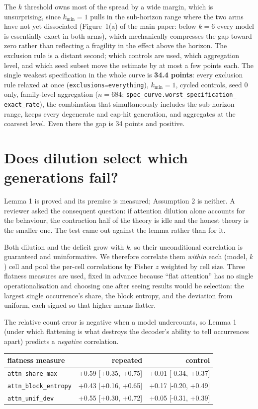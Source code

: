 \documentclass[11pt]{article}
\begin{document}
The $k$ threshold owns most of the spread by a wide margin, which is
unsurprising, since $k_{\min}=1$ pulls in the sub-horizon range where the two arms have not
yet dissociated (Figure~1(a) of the main paper: below $k=6$ every
model is essentially exact in both arms), which mechanically compresses the
gap toward zero rather than reflecting a fragility in the effect above the
horizon. The exclusion rule is a distant second; which controls are used,
which aggregation level, and which seed subset move the estimate by at most a
few points each. The single weakest specification in the whole curve is
\textbf{34.4 points}: every exclusion rule relaxed at once
(\texttt{exclusions=everything}), $k_{\min}=1$, cycled controls, seed 0 only,
family-level aggregation ($n=684$; \texttt{spec\_curve.worst\_specification\_}
\texttt{exact\_rate}), the combination that simultaneously includes the
sub-horizon range, keeps every degenerate and cap-hit generation, and
aggregates at the coarsest level. Even there the gap is 34 points and positive.

\section{Does dilution select which generations fail?}
\label{sec:s12}

Lemma 1 is proved and its premise is measured; Assumption 2 is neither. A
reviewer asked the consequent question: if attention dilution alone accounts for
the behaviour, the contraction half of the theory is idle and the honest theory
is the smaller one. The test came out against the lemma rather than for it.

Both dilution and the deficit grow with $k$, so their unconditional correlation
is guaranteed and uninformative. We therefore correlate them \emph{within} each
(model, $k$) cell and pool the per-cell correlations by Fisher $z$ weighted by
cell size. Three flatness measures are used, fixed in advance because ``flat
attention'' has no single operationalisation and choosing one after seeing
results would be selection: the largest single occurrence's share, the block
entropy, and the deviation from uniform, each signed so that higher means
flatter.

The relative count error is negative when a model undercounts, so Lemma 1
(under which flattening is what destroys the decoder's ability to tell occurrences
apart) predicts a \emph{negative} correlation.

\begin{center}
\begin{tabular}{lrr}
\toprule
flatness measure & repeated & control \\
\midrule
\texttt{attn\_share\_max} & +0.59 [+0.35, +0.75] & +0.01 [-0.34, +0.37] \\
\texttt{attn\_block\_entropy} & +0.43 [+0.16, +0.65] & +0.17 [-0.20, +0.49] \\
\texttt{attn\_unif\_dev} & +0.55 [+0.30, +0.72] & +0.05 [-0.31, +0.39] \\
\bottomrule
\end{tabular}
\end{center}
\end{document}
